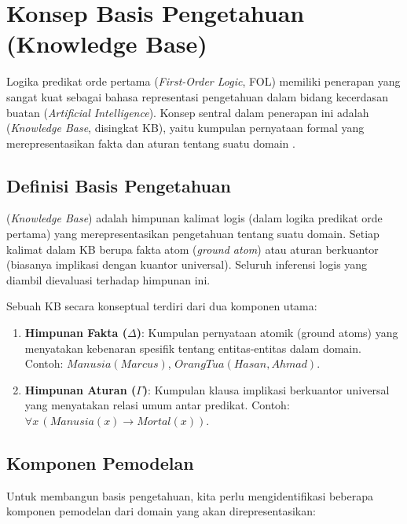 \section{Konsep Basis Pengetahuan (Knowledge Base)}

Logika predikat orde pertama (\textit{First-Order Logic}, FOL) memiliki penerapan yang sangat kuat sebagai bahasa representasi pengetahuan dalam bidang kecerdasan buatan (\textit{Artificial Intelligence}). Konsep sentral dalam penerapan ini adalah  (\textit{Knowledge Base}, disingkat KB), yaitu kumpulan pernyataan formal yang merepresentasikan fakta dan aturan tentang suatu domain \cite{rosen2019}.

\subsection{Definisi Basis Pengetahuan}

\begin{definisi}
 (\textit{Knowledge Base}) adalah himpunan kalimat logis (dalam logika predikat orde pertama) yang merepresentasikan pengetahuan tentang suatu domain. Setiap kalimat dalam KB berupa fakta atom (\textit{ground atom}) atau aturan berkuantor (biasanya implikasi dengan kuantor universal). Seluruh inferensi logis yang diambil dievaluasi terhadap himpunan ini.
\end{definisi}

Sebuah KB secara konseptual terdiri dari dua komponen utama:
\begin{enumerate}
    \item \textbf{Himpunan Fakta ($\Delta$)}: Kumpulan pernyataan atomik (ground atoms) yang menyatakan kebenaran spesifik tentang entitas-entitas dalam domain. Contoh: $Manusia(Marcus)$, $OrangTua(Hasan, Ahmad)$.
    \item \textbf{Himpunan Aturan ($\Gamma$)}: Kumpulan klausa implikasi berkuantor universal yang menyatakan relasi umum antar predikat. Contoh: $\forall x\, (Manusia(x) \rightarrow Mortal(x))$.
\end{enumerate}

\subsection{Komponen Pemodelan}

Untuk membangun basis pengetahuan, kita perlu mengidentifikasi beberapa komponen pemodelan dari domain yang akan direpresentasikan:

